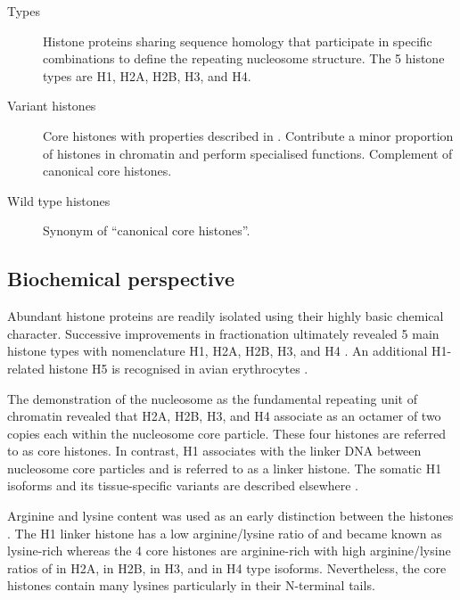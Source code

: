 {\begin{shaded}
\begin{description}
        \item[Types] \hfill \newline
        Histone proteins sharing sequence homology
        that participate in specific combinations to define the repeating nucleosome structure.
        The 5 histone types are H1, H2A, H2B, H3, and H4.

        \item[Variant histones] \hfill \newline
        Core histones with properties described in .
        Contribute a minor proportion of histones in chromatin and perform specialised functions.
        Complement of canonical core histones.

        \item[Wild type histones] \hfill \newline
        Synonym of ``canonical core histones''.
      \end{description}
    \end{shaded}
  }

  \subsection{Biochemical perspective}

    Abundant histone proteins are readily isolated using their
    highly basic chemical character.
    Successive improvements in fractionation ultimately revealed 5 main histone types
    with nomenclature H1, H2A, H2B, H3, and H4 \citep{nomenclature}.
    An additional H1-related histone H5 is recognised in avian erythrocytes \citep{HFive-review}.

    The demonstration of the nucleosome as the fundamental
    repeating unit of chromatin \citep{Kornberg1974}
    revealed that H2A, H2B, H3, and H4 associate as an octamer of two copies each within the
    nucleosome core particle. These four histones are referred to as core histones.
    In contrast, H1 associates with the linker DNA between nucleosome core particles
    and is referred to as a linker histone.
    The somatic H1 isoforms and its tissue-specific
    variants are described elsewhere \citep{HarshmanFreitas2013}.

    Arginine and lysine content was used as an early distinction between the histones \citep{ElginWeintraub1975}.
    The H1 linker histone has a low arginine/lysine ratio of
     \result{}
    and became known as lysine-rich
    whereas the 4 core histones are arginine-rich
    with high arginine/lysine ratios of
     \result{} in H2A,
     \result{} in H2B,
     \result{} in H3,
    and  \result{} in H4 type isoforms.
    Nevertheless, the core histones contain many lysines particularly in their N-terminal tails.

